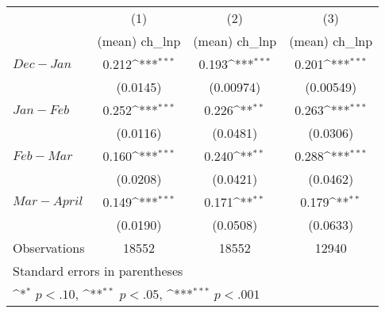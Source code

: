 {
\def\sym#1{\ifmmode^{#1}\else\(^{#1}\)\fi}
\begin{tabular}{l*{3}{c}}
\hline\hline
                    &\multicolumn{1}{c}{(1)}&\multicolumn{1}{c}{(2)}&\multicolumn{1}{c}{(3)}\\
                    &\multicolumn{1}{c}{(mean) ch\_lnp}&\multicolumn{1}{c}{(mean) ch\_lnp}&\multicolumn{1}{c}{(mean) ch\_lnp}\\
\hline
 $ Dec-Jan $        &       0.212\sym{***}&       0.193\sym{***}&       0.201\sym{***}\\
                    &    (0.0145)         &   (0.00974)         &   (0.00549)         \\
[1em]
 $ Jan-Feb $        &       0.252\sym{***}&       0.226\sym{**} &       0.263\sym{***}\\
                    &    (0.0116)         &    (0.0481)         &    (0.0306)         \\
[1em]
 $ Feb-Mar $        &       0.160\sym{***}&       0.240\sym{**} &       0.288\sym{***}\\
                    &    (0.0208)         &    (0.0421)         &    (0.0462)         \\
[1em]
 $ Mar-April $      &       0.149\sym{***}&       0.171\sym{**} &       0.179\sym{**} \\
                    &    (0.0190)         &    (0.0508)         &    (0.0633)         \\
\hline
Observations        &       18552         &       18552         &       12940         \\
\hline\hline
\multicolumn{4}{l}{\footnotesize Standard errors in parentheses}\\
\multicolumn{4}{l}{\footnotesize \sym{*} \(p<.10\), \sym{**} \(p<.05\), \sym{***} \(p<.001\)}\\
\end{tabular}
}
